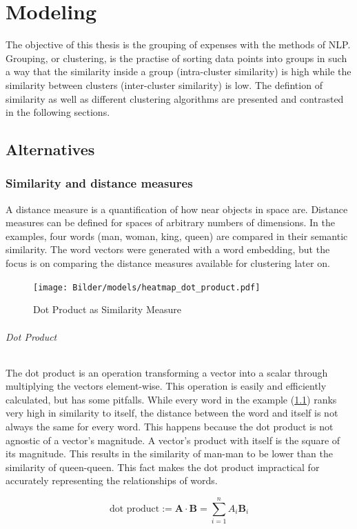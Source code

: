 \chapter{Modeling}
The objective of this thesis is the grouping of expenses with the methods of \ac{NLP}. Grouping, or clustering, is the practise of sorting data points into groups in such a way that the similarity inside a group (intra-cluster similarity) is high while the similarity between clusters (inter-cluster similarity) is low. The defintion of similarity as well as different clustering algorithms are presented and contrasted in the following sections.


\section{Alternatives}
\subsection{Similarity and distance measures}
A distance measure is a quantification of how near objects in space are. Distance measures can be defined for spaces of arbitrary numbers of dimensions. In the examples, four words (man, woman, king, queen) are compared in their semantic similarity. The word vectors were generated with a word embedding, but the focus is on comparing the distance measures available for clustering later on.

		\begin{figure}[!h]
			\centering
			\texttt{[image: Bilder/models/heatmap\_dot\_product.pdf]}
			\caption{Dot Product as Similarity Measure}
			\label{fig:dotproduct-heatmap}
		\end{figure}
	
		\subparagraph{Dot Product}
		The dot product is an operation transforming a vector into a scalar through multiplying the vectors element-wise. This operation is easily and efficiently calculated, but has some pitfalls.
		While every word in the example (\ref{fig:dotproduct-heatmap}) ranks very high in similarity to itself, the distance between the word and itself is not always the same for every word. This happens because the dot product is not agnostic of a vector's magnitude. A vector's product with itself is the square of its magnitude. This results in the similarity of man-man to be lower than the similarity of queen-queen.
		This fact makes the dot product impractical for accurately representing the relationships of words.
	
					\[ 
				\text{dot product} :=  \mathbf{A} \cdot \mathbf{B}= \sum\limits_{i=1}^{n}{A_i  \mathbf{B}_i} 
				\]


